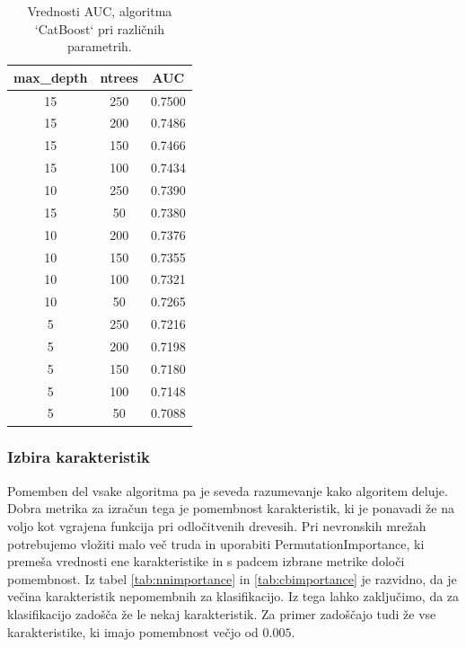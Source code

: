 \documentclass{article}
\begin{document}
\begin{table}[H]
	\centering
	\begin{tabular}{|c|c|c|}
	\hline
	\textbf{max\_depth} & \textbf{ntrees} & \textbf{AUC} \\
	\hline
	15 & 250 & 0.7500 \\
	15 & 200 & 0.7486 \\
	15 & 150 & 0.7466 \\
	15 & 100 & 0.7434 \\
	10 & 250 & 0.7390 \\
	15 & 50  & 0.7380 \\
	10 & 200 & 0.7376 \\
	10 & 150 & 0.7355 \\
	10 & 100 & 0.7321 \\
	10 & 50  & 0.7265 \\
	5  & 250 & 0.7216 \\
	5  & 200 & 0.7198 \\
	5  & 150 & 0.7180 \\
	5  & 100 & 0.7148 \\
	5  & 50  & 0.7088 \\
	\hline
	\end{tabular}
	\caption{Vrednosti AUC, algoritma `CatBoost` pri različnih parametrih.}
\end{table}
\newpage
\subsubsection{Izbira karakteristik}
Pomemben del vsake algoritma pa je seveda razumevanje kako algoritem deluje. Dobra metrika za izračun tega je pomembnost karakteristik, ki je ponavadi že na voljo kot vgrajena funkcija pri odločitvenih drevesih. Pri nevronskih mrežah potrebujemo vložiti malo več truda in uporabiti PermutationImportance, ki premeša vrednosti ene karakteristike in s padcem izbrane metrike določi pomembnost. Iz tabel \ref{tab:nnimportance} in \ref{tab:cbimportance} je razvidno, da je večina karakteristik nepomembnih za klasifikacijo. Iz tega lahko zaključimo, da za klasifikacijo zadošča že le nekaj karakteristik. Za primer zadoščajo tudi že vse karakteristike, ki imajo pomembnost večjo od $0.005$.
\end{document}
